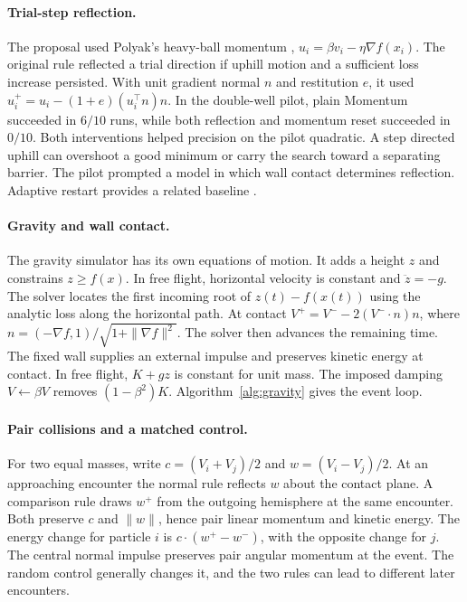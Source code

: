 \documentclass[10pt,letterpaper]{article}
\begin{document}
\paragraph{Trial-step reflection.}
The proposal used Polyak's heavy-ball momentum \cite{polyak}, \(u_i=\beta v_i-\eta\nabla f(x_i)\). The original rule reflected a trial direction if uphill motion and a sufficient loss increase persisted. With unit gradient normal \(n\) and restitution \(e\), it used \(u_i^+=u_i-(1+e)(u_i^\top n)n\). In the double-well pilot, plain Momentum succeeded in \(6/10\) runs, while both reflection and momentum reset succeeded in \(0/10\). Both interventions helped precision on the pilot quadratic. A step directed uphill can overshoot a good minimum or carry the search toward a separating barrier. The pilot prompted a model in which wall contact determines reflection. Adaptive restart provides a related baseline \cite{restart}.

\paragraph{Gravity and wall contact.}
The gravity simulator has its own equations of motion. It adds a height \(z\) and constrains \(z\ge f(x)\). In free flight, horizontal velocity is constant and \(\ddot z=-g\). The solver locates the first incoming root of \(z(t)-f(x(t))\) using the analytic loss along the horizontal path. At contact \(V^+=V^--2(V^-\cdot n)n\), where \(n=(-\nabla f,1)/\sqrt{1+\|\nabla f\|^2}\). The solver then advances the remaining time. The fixed wall supplies an external impulse and preserves kinetic energy at contact. In free flight, \(K+gz\) is constant for unit mass. The imposed damping \(V\leftarrow \beta V\) removes \((1-\beta^2)K\). Algorithm~\ref{alg:gravity} gives the event loop.

\paragraph{Pair collisions and a matched control.}
For two equal masses, write \(c=(V_i+V_j)/2\) and \(w=(V_i-V_j)/2\). At an approaching encounter the normal rule reflects \(w\) about the contact plane. A comparison rule draws \(w^+\) from the outgoing hemisphere at the same encounter. Both preserve \(c\) and \(\|w\|\), hence pair linear momentum and kinetic energy. The energy change for particle \(i\) is \(c\cdot(w^+-w^-)\), with the opposite change for \(j\). The central normal impulse preserves pair angular momentum at the event. The random control generally changes it, and the two rules can lead to different later encounters.
\end{document}
